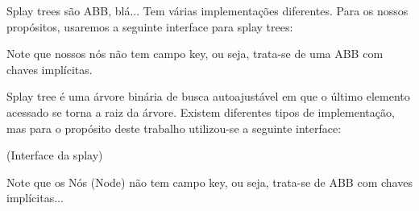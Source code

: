 Splay trees são ABB, blá... Tem várias implementações diferentes. 
Para os nossos propósitos, usaremos a seguinte interface para splay trees: 

Note que nossos nós não tem campo key, ou seja, trata-se de uma ABB com chaves implícitas. 




Splay tree é uma árvore binária de busca autoajustável em que o último elemento acessado se torna a raiz da árvore. Existem diferentes tipos de implementação, mas para o propósito deste trabalho utilizou-se a seguinte interface:

(Interface da splay)

Note que os Nós (Node) não tem campo key, ou seja, trata-se de ABB com chaves implícitas...

